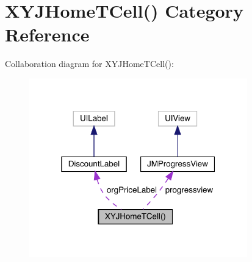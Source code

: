 \hypertarget{category_x_y_j_home_t_cell_07_08}{}\section{X\+Y\+J\+Home\+T\+Cell() Category Reference}
\label{category_x_y_j_home_t_cell_07_08}


Collaboration diagram for X\+Y\+J\+Home\+T\+Cell()\+:\nopagebreak
\begin{figure}[H]
\begin{center}
\leavevmode
\includegraphics[width=268pt]{category_x_y_j_home_t_cell_07_08__coll__graph}
\end{center}
\end{figure}
